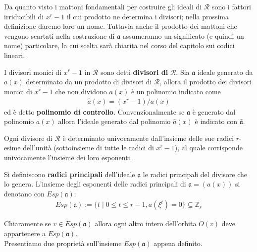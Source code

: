 Da quanto visto i mattoni fondamentali per costruire gli ideali di $\mathcal{R}$ sono i fattori irriducibili di $x^r-1$ il cui prodotto ne determina i divisori; nella prossima definizione daremo loro un nome. Tuttavia anche il prodotto dei mattoni che vengono scartati nella costruzione di $\mathfrak{a}$ assumeranno un significato (e quindi un nome) particolare, la cui scelta sarà chiarita nel corso del capitolo sui codici lineari.
\begin{definizione}
   I divisori monici di $x^r - 1$ in $\mathcal{R}$ sono detti {\bf divisori di} $\mathcal{R}$. Sia $\mathfrak{a}$ ideale generato da $a(x)$ determinato da un prodotto di divisori di $\mathcal{R}$, allora il prodotto dei divisori monici di $x^r - 1$ che non dividono $a(x)$ è un polinomio indicato come
   \begin{align*}
      \hat{a}(x) = (x^r-1)/a(x)
   \end{align*}
   ed è detto {\bf polinomio di controllo}. Convenzionalmente se $\mathfrak{a}$ è generato dal polinomio $a(x)$ allora l'ideale generato dal polinomio $\hat{a}(x)$ è indicato con $\hat{\mathfrak{a}}$.
\end{definizione}
\noindent
Ogni divisore di $\mathcal{R}$ è determinato univocamente dall'insieme delle sue radici $r$-esime dell'unità (sottoinsieme di tutte le radici di $x^r -1$), al quale corrisponde univocamente l'insieme dei loro esponenti.
\begin{definizione}
   Si definiscono {\bf radici principali} dell'ideale $\mathfrak{a}$ le radici principali del divisore che lo genera. L'insieme degli esponenti delle radici principali di $\mathfrak{a} = (a(x))$ si denotano con $Esp(\mathfrak{a})$:
   \begin{align*}
      Esp(\mathfrak{a}) := \lbrace t \mid 0\leq t \leq r-1, a(\xi^{t}) = 0 \rbrace \subseteq \mathbb{Z}_{r}
   \end{align*}
\end{definizione}
\noindent
Chiaramente se $v \in Esp(\mathfrak{a})$ allora ogni altro intero dell'orbita $O(v)$ deve appartenere a $Esp(\mathfrak{a})$.
\\
Presentiamo due proprietà sull'insieme $Esp(\mathfrak{a})$ appena definito.

